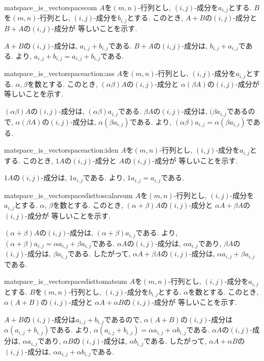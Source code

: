 \begin{proofof*}{matspace_is_vectorspace}{com}
  $A$を$(m,n)$-行列とし, $(i,j)$-成分を$a_{i,j}$とする.
  $B$を$(m,n)$-行列とし, $(i,j)$-成分を$b_{i,j}$とする.
  このとき,
  $A+B$の$(i,j)$-成分と
  $B+A$の$(i,j)$-成分が
  等しいことを示す.
  
  $A+B$の$(i,j)$-成分は, $a_{i,j}+b_{i,j}$である.
  $B+A$の$(i,j)$-成分は, $b_{i,j}+a_{i,j}$である.
  より,
  $a_{i,j}+b_{i,j}=a_{i,j}+b_{i,j}$である.
\end{proofof*}
\begin{proofof*}{matspace_is_vectorspace}{action:ass}
  $A$を$(m,n)$-行列とし, $(i,j)$-成分を$a_{i,j}$とする.
  $\alpha,\beta$を数とする.
  このとき,
  $(\alpha\beta)A$の$(i,j)$-成分と
  $\alpha(\beta A)$の$(i,j)$-成分が
  等しいことを示す.

  $(\alpha\beta)A$の$(i,j)$-成分は, $(\alpha\beta)a_{i,j}$である.
  $\beta A$の$(i,j)$-成分は, $(\beta a_{i,j}$であるので,
  $\alpha(\beta A)$の$(i,j)$-成分は, $\alpha(\beta a_{i,j})$である.
  より,
  $(\alpha\beta)a_{i,j}=\alpha(\beta a_{i,j})$である.
\end{proofof*}

\begin{proofof*}{matspace_is_vectorspace}{action:iden}
  $A$を$(m,n)$-行列とし, $(i,j)$-成分を$a_{i,j}$とする.
  このとき,
  $1A$の$(i,j)$-成分と
  $A$の$(i,j)$-成分が
  等しいことを示す.

  $1A$の$(i,j)$-成分は, $1a_{i,j}$である.
  より,
  $1a_{i,j}=a_{i,j}$である.
\end{proofof*}

\begin{proofof*}{matspace_is_vectorspace}{disttoscalarsum}
  $A$を$(m,n)$-行列とし, $(i,j)$-成分を$a_{i,j}$とする.
  $\alpha$, $\beta$を数とする.
  このとき,
  $(\alpha+\beta)A$の$(i,j)$-成分と
  $\alpha A+ \beta A$の$(i,j)$-成分が
  等しいことを示す.
  

  $(\alpha+\beta)A$の$(i,j)$-成分は, $(\alpha+\beta)a_{i,j}$である.
  より,
  $(\alpha+\beta)a_{i,j}=\alpha a_{i,j}+\beta a_{i,j}$である.
  $\alpha A$の$(i,j)$-成分は, $\alpha a_{i,j}$であり,
  $\beta A$の$(i,j)$-成分は, $\beta a_{i,j}$である.
  したがって,
  $\alpha A+\beta A$の$(i,j)$-成分は, $\alpha a_{i,j}+\beta a_{i,j}$である.
\end{proofof*}

\begin{proofof*}{matspace_is_vectorspace}{disttomatsum}
  $A$を$(m,n)$-行列とし, $(i,j)$-成分を$a_{i,j}$とする.
  $B$を$(m,n)$-行列とし, $(i,j)$-成分を$b_{i,j}$とする.
  $\alpha$を数とする.
  このとき,
  $\alpha(A+B)$の$(i,j)$-成分と
  $\alpha A+ \alpha B$の$(i,j)$-成分が
  等しいことを示す.
  

  $A+B$の$(i,j)$-成分は$a_{i,j}+b_{i,j}$であるので,
  $\alpha(A+B)$の$(i,j)$-成分は$\alpha(a_{i,j}+b_{i,j})$である.
  より,
  $\alpha(a_{i,j}+b_{i,j})=\alpha a_{i,j}+ \alpha b_{i,j}$である.
  $\alpha A$の$(i,j)$-成分は, $\alpha a_{i,j}$であり,
  $\alpha B$の$(i,j)$-成分は, $\alpha b_{i,j}$である.
  したがって,
  $\alpha A+\alpha B$の$(i,j)$-成分は, $\alpha a_{i,j}+\alpha b_{i,j}$である.
\end{proofof*}

